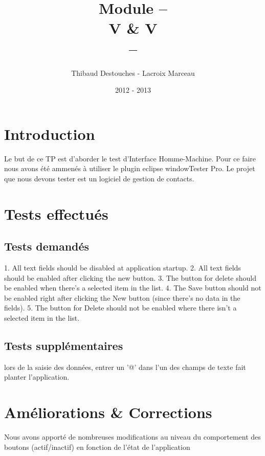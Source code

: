 \documentclass{article}
\title{Module --
\\
V \& V
\\
--}
\author{Thibaud Destouches - Lacroix Marceau}
\date{2012 - 2013}
\begin{document}
\begin{titlepage}
\maketitle
\tableofcontents
\end{titlepage}

\newpage
\section{Introduction}

Le but de ce TP est d’aborder le test d’Interface Homme-Machine. Pour ce faire nous avons été ammenés à utiliser le plugin eclipse windowTester Pro. Le projet que nous devons tester est un logiciel de gestion de contacts.

\section{Tests effectués}

\subsection{Tests demandés}

1. All text fields should be disabled at application startup.
2. All text fields should be enabled after clicking the new button.
3. The button for delete should be enabled when there's a selected item in the list.
4. The Save button should not be enabled right after clicking the New button (since there's no data in the fields). 
5. The button for Delete should not be enabled where there isn't a selected item in the list.

\subsection{Tests supplémentaires}

lors de la saisie des données, entrer un '@' dans l'un des champs de texte fait planter l'application.	



\section{Améliorations \& Corrections}

Nous avons apporté de nombreuses modifications au niveau du comportement des boutons (actif/inactif) en fonction de l'état de l'application

\newpage
\end{document}
